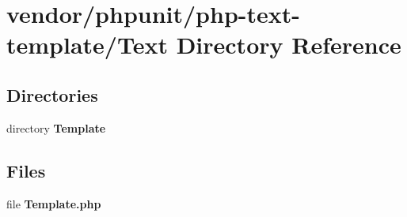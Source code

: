 \section{vendor/phpunit/php-\/text-\/template/\+Text Directory Reference}
\label{dir_db6aff8046c6ea499f36a5bb188f45af}
\subsection*{Directories}
\begin{DoxyCompactItemize}
\item 
directory {\bf Template}
\end{DoxyCompactItemize}
\subsection*{Files}
\begin{DoxyCompactItemize}
\item 
file {\bf Template.\+php}
\end{DoxyCompactItemize}
